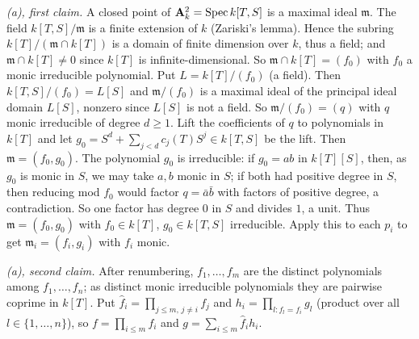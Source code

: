 \documentclass[11pt]{article}
\begin{document}
\pf
\emph{(a), first claim.} A closed point of $\mathbf A^2_k=\operatorname{Spec} k[T,S]$ is a maximal ideal $\mathfrak m$. The field $k[T,S]/\mathfrak m$ is a finite extension of $k$ (Zariski's lemma). Hence the subring $k[T]/(\mathfrak m\cap k[T])$ is a domain of finite dimension over $k$, thus a field; and $\mathfrak m\cap k[T]\ne0$ since $k[T]$ is infinite-dimensional. So $\mathfrak m\cap k[T]=(f_0)$ with $f_0$ a monic irreducible polynomial. Put $L=k[T]/(f_0)$ (a field). Then $k[T,S]/(f_0)=L[S]$ and $\mathfrak m/(f_0)$ is a maximal ideal of the principal ideal domain $L[S]$, nonzero since $L[S]$ is not a field. So $\mathfrak m/(f_0)=(q)$ with $q$ monic irreducible of degree $d\ge1$. Lift the coefficients of $q$ to polynomials in $k[T]$ and let $g_0=S^d+\sum_{j<d}c_j(T)S^j\in k[T,S]$ be the lift. Then $\mathfrak m=(f_0,g_0)$. The polynomial $g_0$ is irreducible: if $g_0=ab$ in $k[T][S]$, then, as $g_0$ is monic in $S$, we may take $a,b$ monic in $S$; if both had positive degree in $S$, then reducing mod $f_0$ would factor $q=\bar a\bar b$ with factors of positive degree, a contradiction. So one factor has degree $0$ in $S$ and divides $1$, a unit. Thus $\mathfrak m=(f_0,g_0)$ with $f_0\in k[T]$, $g_0\in k[T,S]$ irreducible. Apply this to each $p_i$ to get $\mathfrak m_i=(f_i,g_i)$ with $f_i$ monic.

\emph{(a), second claim.} After renumbering, $f_1,\dots,f_m$ are the distinct polynomials among $f_1,\dots,f_n$; as distinct monic irreducible polynomials they are pairwise coprime in $k[T]$. Put $\hat f_i=\prod_{j\le m,\,j\ne i}f_j$ and $h_i=\prod_{l:f_l=f_i}g_l$ (product over all $l\in\{1,\dots,n\}$), so $f=\prod_{i\le m}f_i$ and $g=\sum_{i\le m}\hat f_ih_i$.
\end{document}
